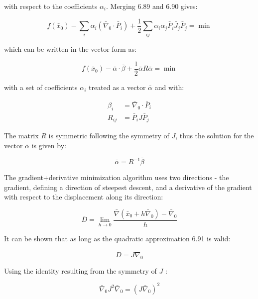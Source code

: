 \documentclass[10pt]{article}
\begin{document}
with respect to the coefficients $\alpha_{i}$. Merging 6.89 and 6.90 gives:


\begin{equation*}
f\left(\bar{x}_{0}\right)-\sum_{i} \alpha_{i}\left(\bar{\nabla}_{0} \cdot \bar{P}_{i}\right)+\frac{1}{2} \sum_{i j} \alpha_{i} \alpha_{j} \bar{P}_{i} \bar{J}_{j} \bar{P}_{j}=\min \tag{6.95}
\end{equation*}


which can be written in the vector form as:


\begin{equation*}
f\left(\bar{x}_{0}\right)-\bar{\alpha} \cdot \bar{\beta}+\frac{1}{2} \bar{\alpha} R \bar{\alpha}=\min \tag{6.96}
\end{equation*}


with a set of coefficients $\alpha_{i}$ treated as a vector $\bar{\alpha}$ and with:


\begin{align*}
\beta_{i} & =\bar{\nabla}_{0} \cdot \bar{P}_{i}  \tag{6.97}\\
R_{i j} & =\bar{P}_{i} J \bar{P}_{j}
\end{align*}


The matrix $R$ is symmetric following the symmetry of $J$, thus the solution for the vector $\bar{\alpha}$ is given by:


\begin{equation*}
\bar{\alpha}=R^{-1} \bar{\beta} \tag{6.98}
\end{equation*}


The gradient+derivative minimization algorithm uses two directions - the gradient, defining a direction of steepest descent, and a derivative of the gradient with respect to the displacement along its direction:


\begin{equation*}
\bar{D}=\lim _{h \rightarrow 0} \frac{\bar{\nabla}\left(\bar{x}_{0}+h \bar{\nabla}_{0}\right)-\bar{\nabla}_{0}}{h} \tag{6.99}
\end{equation*}


It can be shown that as long as the quadratic approximation 6.91 is valid:


\begin{equation*}
\bar{D}=J \bar{\nabla}_{0} \tag{6.100}
\end{equation*}


Using the identity resulting from the symmetry of $J$ :


\begin{equation*}
\bar{\nabla}_{0} J^{2} \bar{\nabla}_{0}=\left(J \bar{\nabla}_{0}\right)^{2} \tag{6.101}
\end{equation*}
\end{document}
